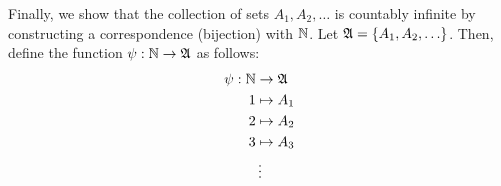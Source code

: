 \begin{answer}
\begin{enumroman}
    \item Finally, we show that the collection of sets $A_1, A_2, \ldots$ is countably
      infinite by constructing a correspondence (bijection) with $\mathbb{N}$.
      Let $\mathfrak{A} = \left\{A_1, A_2, \ldots\right\}$.
      Then, define the function $\psi : \mathbb{N} \to \mathfrak{A}$ as follows:
      \begin{align*}
        \psi : \mathbb{N} &\to \mathfrak{A} \\
        1 &\mapsto A_1 \\
        2 &\mapsto A_2 \\
        3 &\mapsto A_3 \\
        &\vdots
      \end{align*}
  \end{enumroman}
\end{answer}
